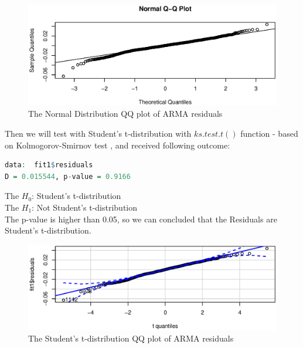 \FloatBarrier
\begin{figure}[!htbp]
  \centering
  \includegraphics[width=\textwidth]{img/Fig10.eps}
  \caption{The Normal Distribution QQ plot of ARMA residuals}
\end{figure}
\FloatBarrier
Then we will test with Student's t-distribution with $ks.test.t()$ function - based on Kolmogorov-Smirnov test \cite{dujrbin1973distribution}, and received following outcome:
\begin{lstlisting}[language=R, caption=Kolmogorov-Smirnov test student-t with df=7.42]
data:  fit1$residuals
D = 0.015544, p-value = 0.9166
\end{lstlisting}
The $H_0$: Student's t-distribution \\
The $H_1$: Not Student's t-distribution \\
The p-value is higher than 0.05, so we can concluded that the Residuals are Student's t-distribution. 

\FloatBarrier
\begin{figure}[!htbp]
  \centering
  \includegraphics[width=\textwidth]{img/Fig11.eps}
  \caption{The Student's t-distribution QQ plot of ARMA residuals}
\end{figure}
\FloatBarrier

